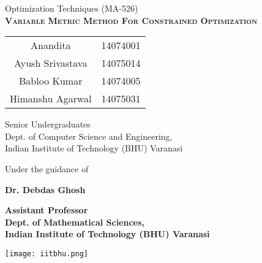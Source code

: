 \documentclass{article}
\begin{document}
\begin{titlepage}
    \begin{center}
        \vspace*{1cm}
        
        \large{Optimization Techniques (MA-526)}\\
        \Large{\textsc{\textbf{Variable Metric Method For Constrained Optimization}}}
 
        \vspace{1cm}
 
        \begin{table}[htbp]
    	\centering
    		\begin{tabular}{cc}
             Anandita & 14074001 \\
             Ayush Srivastava & 14075014\\
             Babloo Kumar & 14074005 \\
             Himanshu Agarwal & 14075031
            \end{tabular}
 		\end{table}
		
		\small{Senior Undergraduates\\
        Dept. of Computer Science and Engineering,\\
        Indian Institute of Technology (BHU) Varanasi}
 			
		\vspace{1cm}
			
        \small{Under the guidance of}
        
        \vspace{0.5cm}
        
        \large{\textbf{Dr. Debdas Ghosh}}
        
        \vspace{0.5cm}
           
        \normalsize{\textbf{Assistant Professor\\
        Dept. of Mathematical Sciences,\\
        Indian Institute of Technology (BHU) Varanasi}}
        
        \vspace{1cm}
        
        \texttt{[image: iitbhu.png]}
        
        \vspace{1cm}        
    \end{center}
\end{titlepage}
\end{document}
